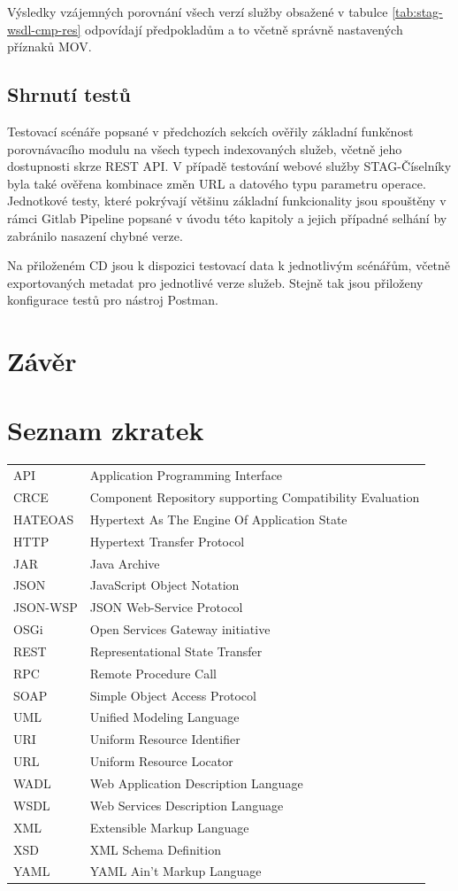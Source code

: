 \documentclass[czech,DP]{thesiskiv}
\newcommand\nomenclature[2]{#1 & #2 \\}
\begin{document}
Výsledky vzájemných porovnání všech verzí služby obsažené v tabulce \ref{tab:stag-wsdl-cmp-res} odpovídají předpokladům a to včetně správně nastavených příznaků MOV.

\section{Shrnutí testů}

Testovací scénáře popsané v předchozích sekcích ověřily základní funkčnost porovnávacího modulu na všech typech indexovaných služeb, včetně jeho dostupnosti skrze REST API. V případě testování webové služby STAG-Číselníky byla také ověřena kombinace změn URL a datového typu parametru operace. Jednotkové testy, které pokrývají většinu základní funkcionality jsou spouštěny v rámci Gitlab Pipeline popsané v úvodu této kapitoly a jejich případné selhání by zabránilo nasazení chybné verze.

Na přiloženém CD jsou k dispozici testovací data k jednotlivým scénářům, včetně exportovaných metadat pro jednotlivé verze služeb. Stejně tak jsou přiloženy konfigurace testů pro nástroj Postman.


\chapter{Závěr}	

 
% 
%

{\raggedright\small

}

\chapter*{Seznam zkratek}

\begin{longtable}{@{}p{3cm}@{}p{\dimexpr\textwidth-1cm\relax}@{}}
	\nomenclature{API}{Application Programming Interface}
	\nomenclature{CRCE}{Component Repository supporting Compatibility Evaluation}
	\nomenclature{HATEOAS}{Hypertext As The Engine Of Application State}
	\nomenclature{HTTP}{Hypertext Transfer Protocol}
	\nomenclature{JAR}{Java Archive}
	\nomenclature{JSON}{JavaScript Object Notation}
	\nomenclature{JSON-WSP}{JSON Web-Service Protocol}
	\nomenclature{OSGi}{Open Services Gateway initiative}
	\nomenclature{REST}{Representational State Transfer}
	\nomenclature{RPC}{Remote Procedure Call}
	\nomenclature{SOAP}{Simple Object Access Protocol}
	\nomenclature{UML}{Unified Modeling Language}
	\nomenclature{URI}{Uniform Resource Identifier}
	\nomenclature{URL}{Uniform Resource Locator}
	\nomenclature{WADL}{Web Application Description Language}
	\nomenclature{WSDL}{Web Services Description Language}
	\nomenclature{XML}{Extensible Markup Language}
	\nomenclature{XSD}{XML Schema Definition}
	\nomenclature{YAML}{YAML Ain't Markup Language}
\end{longtable}
\end{document}
